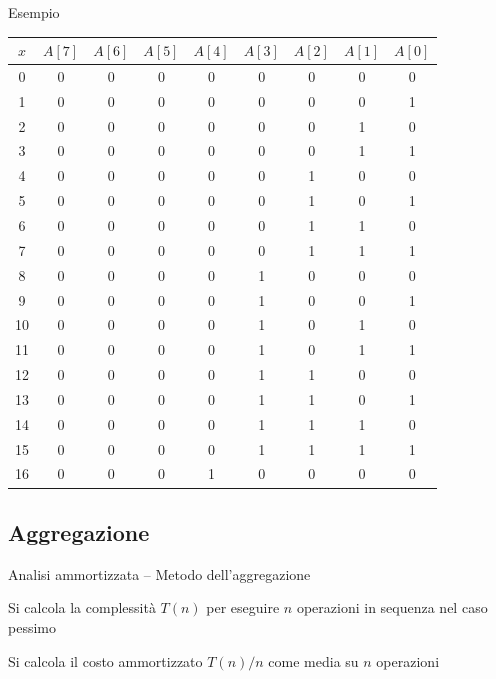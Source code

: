 \begin{frame}{Esempio}
	
\vspace{-6pt}
\small
\begin{tabular}{ccccccccc}
 $x$  &  $A[7]$ & $A[6]$ & $A[5]$ & $A[4]$ & $A[3]$ & $A[2]$ & $A[1]$ & $A[0]$ \\\hline
 0 & 0 & 0 & 0 & 0 & 0 & 0 & 0 & 0 \\
 1 & 0 & 0 & 0 & 0 & 0 & 0 & 0 & 1 \\
 2 & 0 & 0 & 0 & 0 & 0 & 0 & 1 & 0 \\
 3 & 0 & 0 & 0 & 0 & 0 & 0 & 1 & 1 \\
 4 & 0 & 0 & 0 & 0 & 0 & 1 & 0 & 0 \\
 5 & 0 & 0 & 0 & 0 & 0 & 1 & 0 & 1 \\
 6 & 0 & 0 & 0 & 0 & 0 & 1 & 1 & 0 \\
 7 & 0 & 0 & 0 & 0 & 0 & 1 & 1 & 1 \\
 8 & 0 & 0 & 0 & 0 & 1 & 0 & 0 & 0 \\
 9 & 0 & 0 & 0 & 0 & 1 & 0 & 0 & 1 \\
10 & 0 & 0 & 0 & 0 & 1 & 0 & 1 & 0 \\
11 & 0 & 0 & 0 & 0 & 1 & 0 & 1 & 1 \\
12 & 0 & 0 & 0 & 0 & 1 & 1 & 0 & 0 \\
13 & 0 & 0 & 0 & 0 & 1 & 1 & 0 & 1 \\
14 & 0 & 0 & 0 & 0 & 1 & 1 & 1 & 0 \\
15 & 0 & 0 & 0 & 0 & 1 & 1 & 1 & 1 \\
16 & 0 & 0 & 0 & 1 & 0 & 0 & 0 & 0 \\
\end{tabular}    

\end{frame}	



\subsection{Aggregazione}

\begin{frame}{Analisi ammortizzata -- Metodo dell'aggregazione}

\vspace{-9pt}
\begin{myboxtitle}
\BI
\item Si calcola la complessità $T(n)$ per eseguire \alert{$n$ operazioni} in \alert{sequenza} nel \alert{caso pessimo}
\item Si calcola il \alert{costo ammortizzato $T(n)/n$ } come \alert{media} su $n$ operazioni
\EI
\end{myboxtitle}



\end{frame}

